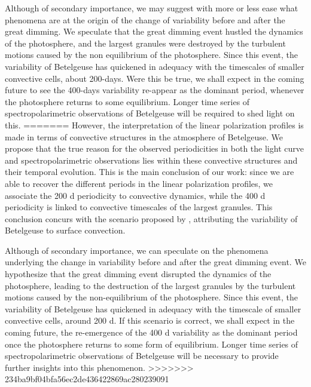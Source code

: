 \documentclass{aa}
\begin{document}
Although of secondary importance, we may suggest with more or less ease what phenomena are at the origin of the change of variability before and after the 
great dimming. We speculate that the great dimming event hustled the dynamics of the photosphere, and the largest granules were 
destroyed by the turbulent motions caused by the non equilibrium of the photosphere. Since this event, the variability of Betelgeuse has 
quickened  in adequacy with the timescales of  smaller convective cells, about 200-days. Were this be true, we shall expect in the 
coming future to see the 400-days variability re-appear as the dominant period, whenever  the photosphere returns to some equilibrium. 
Longer time  series of spectropolarimetric observations of Betelgeuse will be required to shed light on this.
=======
However, the interpretation of the linear polarization profiles is made in terms of convective structures in the atmosphere of Betelgeuse. We propose that the true reason for the observed periodicities in both the light curve and spectropolarimetric observations lies within these convective structures and their temporal evolution. This is the main conclusion of our work: since we are able to recover the different periods in the linear polarization profiles, we associate the 200 d periodicity to convective dynamics, while the 400 d periodicity is linked to convective timescales of the largest granules. This conclusion concurs with the scenario proposed by \cite{gray_mass_2008}, attributing the variability of Betelgeuse to surface convection. 

Although of secondary importance, we can speculate on the phenomena underlying the change in variability before and after the great dimming event. We hypothesize that the great dimming event disrupted the dynamics of the photosphere, leading to the destruction of the largest granules by the turbulent motions caused by the non-equilibrium of the photosphere. Since this event, the variability of Betelgeuse has quickened in adequacy with the timescale of smaller convective cells, around 200 d. If this scenario is correct, we shall expect in the coming future, the re-emergence of the 400 d variability as the dominant period once the photosphere returns to some form of equilibrium. Longer time 
series of spectropolarimetric observations of Betelgeuse will be necessary to provide further insights into this phenomenon.
>>>>>>> 234ba9bf04bfa56ec2de436422869ac280239091
\end{document}
